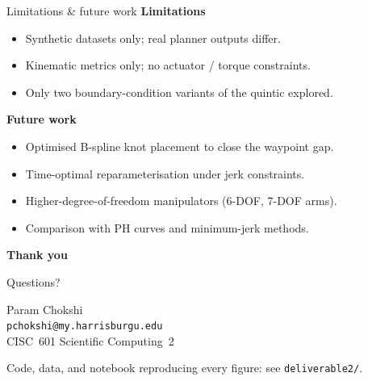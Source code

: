 \documentclass[aspectratio=169]{beamer}
\begin{document}
\begin{frame}{Limitations \& future work}
\textbf{Limitations}
\begin{itemize}
\small
\item Synthetic datasets only; real planner outputs differ.
\item Kinematic metrics only; no actuator / torque constraints.
\item Only two boundary-condition variants of the quintic explored.
\end{itemize}
\vspace{0.3em}
\textbf{Future work}
\begin{itemize}
\small
\item Optimised B-spline knot placement to close the waypoint gap.
\item Time-optimal reparameterisation under jerk constraints.
\item Higher-degree-of-freedom manipulators (6-DOF, 7-DOF arms).
\item Comparison with PH curves and minimum-jerk methods.
\end{itemize}
\end{frame}

\begin{frame}[plain]
\begin{center}
\vspace{1.5em}
{\Huge \bfseries Thank you}
\vspace{1em}

{\Large Questions?}
\vspace{2em}

\small
Param Chokshi \\
\texttt{pchokshi@my.harrisburgu.edu} \\
CISC~601 Scientific Computing~2

\vfill
\scriptsize
Code, data, and notebook reproducing every figure: see
\texttt{deliverable2/}.
\end{center}
\end{frame}
\end{document}
